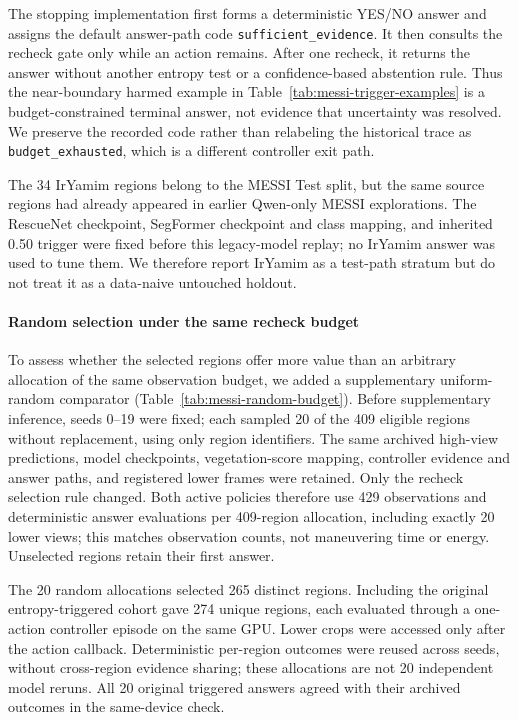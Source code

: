 The stopping implementation first forms a deterministic YES/NO answer and assigns the default answer-path code \texttt{sufficient\_evidence}. It then consults the recheck gate only while an action remains. After one recheck, it returns the answer without another entropy test or a confidence-based abstention rule. Thus the near-boundary harmed example in Table~\ref{tab:messi-trigger-examples} is a budget-constrained terminal answer, not evidence that uncertainty was resolved. We preserve the recorded code rather than relabeling the historical trace as \texttt{budget\_exhausted}, which is a different controller exit path.

The 34 IrYamim regions belong to the MESSI Test split, but the same source
regions had already appeared in earlier Qwen-only MESSI explorations. The
RescueNet checkpoint, SegFormer checkpoint and class mapping, and inherited
0.50 trigger were fixed before this legacy-model replay; no IrYamim answer was
used to tune them. We therefore report IrYamim as a test-path stratum but do
not treat it as a data-naive untouched holdout.



\paragraph{Random selection under the same recheck budget}
To assess whether the selected regions offer more value than an arbitrary allocation of the same observation budget, we added a supplementary uniform-random comparator (Table~\ref{tab:messi-random-budget}). Before supplementary inference, seeds 0--19 were fixed; each sampled 20 of the 409 eligible regions without replacement, using only region identifiers. The same archived high-view predictions, model checkpoints, vegetation-score mapping, controller evidence and answer paths, and registered lower frames were retained. Only the recheck selection rule changed. Both active policies therefore use 429 observations and deterministic answer evaluations per 409-region allocation, including exactly 20 lower views; this matches observation counts, not maneuvering time or energy. Unselected regions retain their first answer.

The 20 random allocations selected 265 distinct regions. Including the original entropy-triggered cohort gave 274 unique regions, each evaluated through a one-action controller episode on the same GPU. Lower crops were accessed only after the action callback. Deterministic per-region outcomes were reused across seeds, without cross-region evidence sharing; these allocations are not 20 independent model reruns. All 20 original triggered answers agreed with their archived outcomes in the same-device check.

